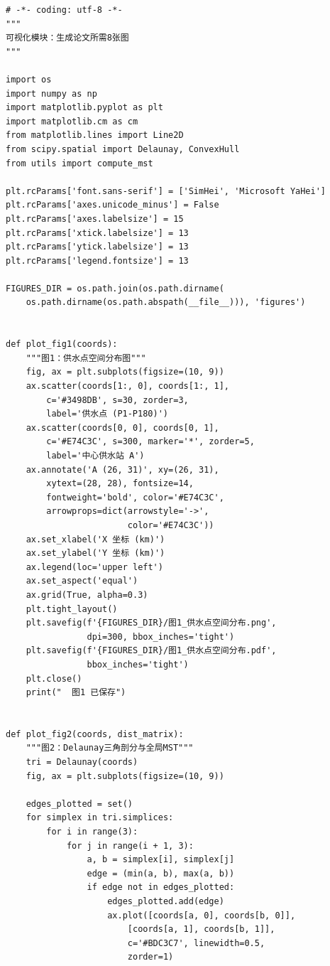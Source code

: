 \documentclass[12pt,a4paper]{ctexart}
\theoremstyle{definition}
\theoremstyle{plain}
\theoremstyle{remark}
\begin{document}
\begin{lstlisting}[caption={\texttt{visualization.py}：论文图表生成}]
# -*- coding: utf-8 -*-
"""
可视化模块：生成论文所需8张图
"""

import os
import numpy as np
import matplotlib.pyplot as plt
import matplotlib.cm as cm
from matplotlib.lines import Line2D
from scipy.spatial import Delaunay, ConvexHull
from utils import compute_mst

plt.rcParams['font.sans-serif'] = ['SimHei', 'Microsoft YaHei']
plt.rcParams['axes.unicode_minus'] = False
plt.rcParams['axes.labelsize'] = 15
plt.rcParams['xtick.labelsize'] = 13
plt.rcParams['ytick.labelsize'] = 13
plt.rcParams['legend.fontsize'] = 13

FIGURES_DIR = os.path.join(os.path.dirname(
    os.path.dirname(os.path.abspath(__file__))), 'figures')


def plot_fig1(coords):
    """图1：供水点空间分布图"""
    fig, ax = plt.subplots(figsize=(10, 9))
    ax.scatter(coords[1:, 0], coords[1:, 1],
        c='#3498DB', s=30, zorder=3,
        label='供水点 (P1-P180)')
    ax.scatter(coords[0, 0], coords[0, 1],
        c='#E74C3C', s=300, marker='*', zorder=5,
        label='中心供水站 A')
    ax.annotate('A (26, 31)', xy=(26, 31),
        xytext=(28, 28), fontsize=14,
        fontweight='bold', color='#E74C3C',
        arrowprops=dict(arrowstyle='->',
                        color='#E74C3C'))
    ax.set_xlabel('X 坐标 (km)')
    ax.set_ylabel('Y 坐标 (km)')
    ax.legend(loc='upper left')
    ax.set_aspect('equal')
    ax.grid(True, alpha=0.3)
    plt.tight_layout()
    plt.savefig(f'{FIGURES_DIR}/图1_供水点空间分布.png',
                dpi=300, bbox_inches='tight')
    plt.savefig(f'{FIGURES_DIR}/图1_供水点空间分布.pdf',
                bbox_inches='tight')
    plt.close()
    print("  图1 已保存")


def plot_fig2(coords, dist_matrix):
    """图2：Delaunay三角剖分与全局MST"""
    tri = Delaunay(coords)
    fig, ax = plt.subplots(figsize=(10, 9))

    edges_plotted = set()
    for simplex in tri.simplices:
        for i in range(3):
            for j in range(i + 1, 3):
                a, b = simplex[i], simplex[j]
                edge = (min(a, b), max(a, b))
                if edge not in edges_plotted:
                    edges_plotted.add(edge)
                    ax.plot([coords[a, 0], coords[b, 0]],
                        [coords[a, 1], coords[b, 1]],
                        c='#BDC3C7', linewidth=0.5,
                        zorder=1)


\end{lstlisting}
\end{document}
